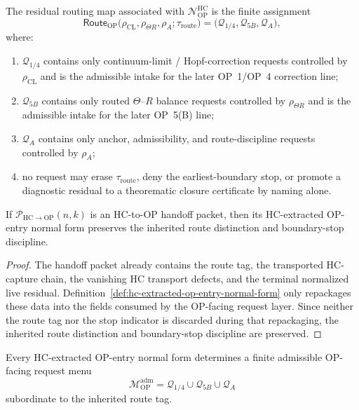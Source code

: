 \begin{definition}
\label{def:residual-routing-out-of-op-entry-normal-form}
The residual routing map associated with $\mathcal N_{\mathrm{OP}}^{\mathrm{HC}}$ is the finite assignment
\[
  \mathsf{Route}_{\mathrm{OP}}
  \bigl(\rho_{\mathrm{CL}},\rho_{\Theta R},\rho_A;\tau_{\mathrm{route}}\bigr)
  =
  \bigl(
    \mathcal Q_{1/4},
    \mathcal Q_{5B},
    \mathcal Q_A
  \bigr),
\]
where:
\begin{enumerate}[leftmargin=2em,label=(\alph*)]
  \item $\mathcal Q_{1/4}$ contains only continuum-limit / Hopf-correction requests controlled by $\rho_{\mathrm{CL}}$ and is the admissible intake for the later OP~1/OP~4 correction line;
  \item $\mathcal Q_{5B}$ contains only routed $\Theta$--$R$ balance requests controlled by $\rho_{\Theta R}$ and is the admissible intake for the later OP~5(B) line;
  \item $\mathcal Q_A$ contains only anchor, admissibility, and route-discipline requests controlled by $\rho_A$;
  \item no request may erase $\tau_{\mathrm{route}}$, deny the earliest-boundary stop, or promote a diagnostic residual to a theorematic closure certificate by naming alone.
\end{enumerate}
\end{definition}

\begin{lemma}
\label{lem:normal-form-extraction-preserves-route-discipline}
If $\mathcal P_{\mathrm{HC}\to\mathrm{OP}}(n,k)$ is an HC-to-OP handoff packet, then its HC-extracted OP-entry normal form preserves the inherited route distinction and boundary-stop discipline.
\end{lemma}

\begin{proof}
The handoff packet already contains the route tag, the transported HC-capture chain, the vanishing HC transport defects, and the terminal normalized live residual.  Definition~\ref{def:hc-extracted-op-entry-normal-form} only repackages these data into the fields consumed by the OP-facing request layer.  Since neither the route tag nor the stop indicator is discarded during that repackaging, the inherited route distinction and boundary-stop discipline are preserved.
\end{proof}

\begin{proposition}
\label{prop:finite-op-facing-request-menu-from-hc-handoff}
Every HC-extracted OP-entry normal form determines a finite admissible OP-facing request menu
\[
  \mathcal M_{\mathrm{OP}}^{\mathrm{adm}}
  =
  \mathcal Q_{1/4}\cup \mathcal Q_{5B}\cup \mathcal Q_A
\]
subordinate to the inherited route tag.
\end{proposition}

